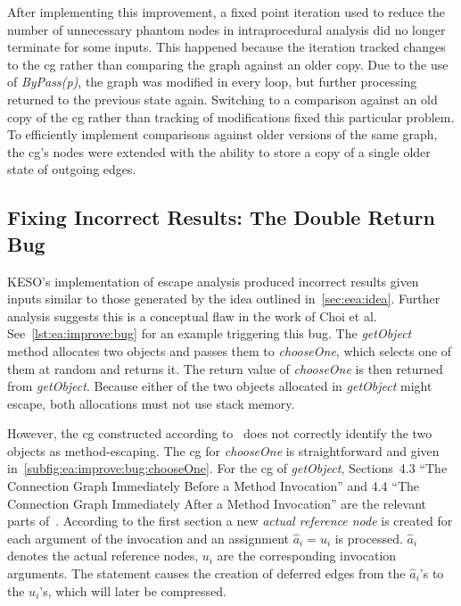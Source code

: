 			After implementing this improvement, a fixed point iteration used to reduce the number of unnecessary phantom
			nodes in intraprocedural analysis did no longer terminate for some inputs. This happened because the iteration
			tracked changes to the \gls{cg} rather than comparing the graph against an older copy. Due to the use of
			\emph{ByPass(p)}, the graph was modified in every loop, but further processing returned to the previous state
			again. Switching to a comparison against an old copy of the \gls{cg} rather than tracking of modifications fixed
			this particular problem. To efficiently implement comparisons against older versions of the same graph, the
			\acrlong{cg}'s nodes were extended with the ability to store a copy of a single older state of outgoing edges.

		\subsection{Fixing Incorrect Results: The Double Return Bug}
			\label{subsec:ea:improve:bug}
			KESO's implementation of escape analysis produced incorrect results given inputs similar to those generated by the
			idea outlined in~\cref{sec:eea:idea}. Further analysis suggests this is a conceptual flaw in the work of Choi et
			al. See~\cref{lst:ea:improve:bug} for an example triggering this bug. The \emph{getObject} method allocates two
			objects and passes them to \emph{chooseOne}, which selects one of them at random and returns it. The return value
			of \emph{chooseOne} is then returned from \emph{getObject}. Because either of the two objects allocated in
			\emph{getObject} might escape, both allocations must not use stack memory.


			However, the \gls{cg} constructed according to~\cite[Sec.~4]{choi:03:toplas} does not correctly identify the two
			objects as method-escaping. The \acrlong{cg} for \emph{chooseOne} is straightforward and given
			in~\cref{subfig:ea:improve:bug:chooseOne}. For the \gls{cg} of \emph{getObject}, Sections~4.3 \enquote{The
			Connection Graph Immediately Before a Method Invocation} and 4.4 \enquote{The Connection Graph Immediately After
			a Method Invocation} are the relevant parts of~\cite{choi:03:toplas}. According to the first section a new
			\emph{actual reference node} is created for each argument of the invocation and an assignment $\hat{a}_i = u_i$ is
			processed. $\hat{a}_i$ denotes the actual reference nodes, $u_i$ are the corresponding invocation arguments. The
			statement causes the creation of deferred edges from the $\hat{a}_i$'s to the $u_i$'s, which will later be
			compressed.

